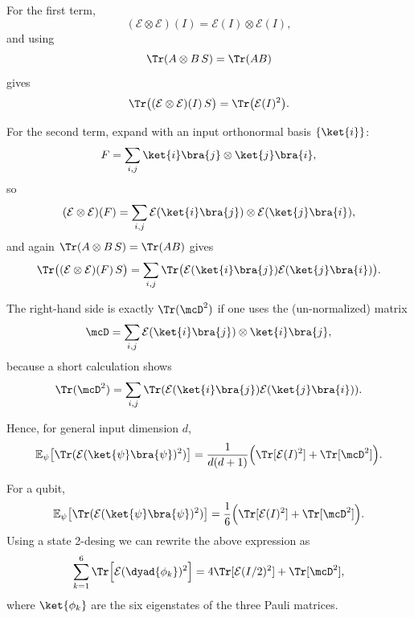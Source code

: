 For the first term,
\begin{equation}
(\mathcal{E} \otimes \mathcal{E})(I) = \mathcal{E}(I) \otimes \mathcal{E}(I),
\end{equation}
and using
\begin{equation}
\Tr(A \otimes B \, S) = \Tr(AB)
\end{equation}
gives
\begin{equation}
\Tr\big( (\mathcal{E} \otimes \mathcal{E})(I) \, S \big) = 
\Tr\big(\mathcal{E}(I)^2 \big).
\end{equation}

For the second term, expand with an input orthonormal basis $\{\ket{i}\}$:
\begin{equation}
F = \sum_{i,j} \ket{i}\bra{j} \otimes \ket{j}\bra{i},
\end{equation}
so
\begin{equation}
(\mathcal{E} \otimes \mathcal{E})(F) = 
\sum_{i,j} \mathcal{E}(\ket{i}\bra{j}) \otimes \mathcal{E}(\ket{j}\bra{i}),
\end{equation}
and again $\Tr(A \otimes B \, S) = \Tr(AB)$ gives
\begin{equation}
\Tr\big( (\mathcal{E} \otimes \mathcal{E})(F) \, S \big)
= \sum_{i,j} \Tr \big( \mathcal{E}(\ket{i}\bra{j})
\mathcal{E}(\ket{j}\bra{i}) \big).
\end{equation}

The right-hand side is exactly $\Tr(\mcD^2)$ if one uses the
(un-normalized) \jami{} matrix
\begin{equation}
\mcD = \sum_{i,j} \mathcal{E}(\ket{i}\bra{j}) \otimes
\ket{i}\bra{j},
\end{equation}
because a short calculation shows
\begin{equation}
\Tr(\mcD^2) = 
\sum_{i,j} \Tr(\mathcal{E}(\ket{i}\bra{j}) \mathcal{E}(\ket{j}\bra{i})).
\end{equation}

Hence, for general input dimension $d$,
\begin{equation}
\mathbb{E}_\psi \big[ \Tr(\mathcal{E}(\ket{\psi}\bra{\psi})^2) \big]
= \frac{1}{d(d+1)} \Big( \Tr[\mathcal{E}(I)^2] + \Tr[\mcD^2] \Big).
\end{equation}

For a qubit,
\begin{equation}
\mathbb{E}_\psi \big[ \Tr(\mathcal{E}(\ket{\psi}\bra{\psi})^2) \big]
= \frac{1}{6} \Big( \Tr[\mathcal{E}(I)^2] + \Tr[\mcD^2] \Big).
\end{equation}
Using a state 2-desing we can rewrite the above expression as
\begin{equation}
\sum_{k=1}^{6} \Tr\Big[ \mathcal{E}(\dyad{\phi_k})^2 \Big]
= 4\Tr[\mathcal{E}(I/2)^2] + \Tr[\mcD^2],
\end{equation}
where $\ket{\phi_k}$ are the six eigenstates of the three Pauli matrices.

